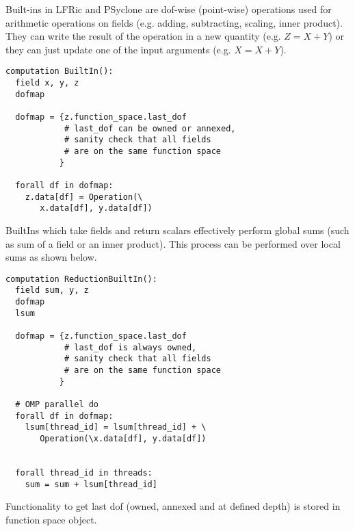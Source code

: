 \documentclass{report}
\begin{document}
Built-ins in LFRic and PSyclone are dof-wise (point-wise) operations
used for arithmetic operations on fields (e.g. adding, subtracting, 
scaling, inner product). They can write the result of the operation 
in a new quantity (e.g. $Z = X + Y$) or they can just
update one of the input arguments (e.g. $X = X + Y$).

\begin{lstlisting}[style=dsl]
computation BuiltIn():
  field x, y, z
  dofmap
  
  dofmap = {z.function_space.last_dof
            # last_dof can be owned or annexed,
            # sanity check that all fields
            # are on the same function space
           }
  
  forall df in dofmap:
    z.data[df] = Operation(\ 
       x.data[df], y.data[df])

\end{lstlisting}

BuiltIns which take fields and return scalars effectively 
perform global sums (such as sum of a field or an inner product).
This process can be performed over local sums as shown below.
\begin{lstlisting}[style=dsl]
computation ReductionBuiltIn():
  field sum, y, z
  dofmap
  lsum 
  
  dofmap = {z.function_space.last_dof
            # last_dof is always owned,
            # sanity check that all fields
            # are on the same function space
           }
  
  # OMP parallel do
  forall df in dofmap:
    lsum[thread_id] = lsum[thread_id] + \
       Operation(\x.data[df], y.data[df])
       
   
  forall thread_id in threads:
    sum = sum + lsum[thread_id] 

\end{lstlisting}


Functionality to get last dof (owned, annexed and at defined depth)
is stored in function space object.
\end{document}
